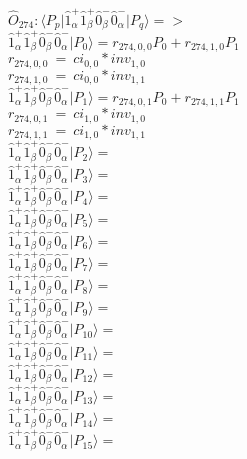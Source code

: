 \documentclass[14pt]{article}
\begin{document}
    $\hat{O}_{274}:  \langle{P_p}\vert \hat{1}_{\alpha}^{+}\hat{1}_{\beta}^{+}\hat{0}_{\beta}^{-}\hat{0}_{\alpha}^{-} \vert{P_q}\rangle => $ \\ 
    $ \hat{1}_{\alpha}^{+}\hat{1}_{\beta}^{+}\hat{0}_{\beta}^{-}\hat{0}_{\alpha}^{-} \vert{P_{0}}\rangle = {r}_{274,0,0}P_{0}+{r}_{274,1,0}P_{1} $ \\ 
    ${r}_{274,0,0}\ =\ {ci}_{0,0}*{inv}_{1,0} $ \\ 
    ${r}_{274,1,0}\ =\ {ci}_{0,0}*{inv}_{1,1} $ \\ 
    $ \hat{1}_{\alpha}^{+}\hat{1}_{\beta}^{+}\hat{0}_{\beta}^{-}\hat{0}_{\alpha}^{-} \vert{P_{1}}\rangle = {r}_{274,0,1}P_{0}+{r}_{274,1,1}P_{1} $ \\ 
    ${r}_{274,0,1}\ =\ {ci}_{1,0}*{inv}_{1,0} $ \\ 
    ${r}_{274,1,1}\ =\ {ci}_{1,0}*{inv}_{1,1} $ \\ 
    $ \hat{1}_{\alpha}^{+}\hat{1}_{\beta}^{+}\hat{0}_{\beta}^{-}\hat{0}_{\alpha}^{-} \vert{P_{2}}\rangle =  $ \\ 
    $ \hat{1}_{\alpha}^{+}\hat{1}_{\beta}^{+}\hat{0}_{\beta}^{-}\hat{0}_{\alpha}^{-} \vert{P_{3}}\rangle =  $ \\ 
    $ \hat{1}_{\alpha}^{+}\hat{1}_{\beta}^{+}\hat{0}_{\beta}^{-}\hat{0}_{\alpha}^{-} \vert{P_{4}}\rangle =  $ \\ 
    $ \hat{1}_{\alpha}^{+}\hat{1}_{\beta}^{+}\hat{0}_{\beta}^{-}\hat{0}_{\alpha}^{-} \vert{P_{5}}\rangle =  $ \\ 
    $ \hat{1}_{\alpha}^{+}\hat{1}_{\beta}^{+}\hat{0}_{\beta}^{-}\hat{0}_{\alpha}^{-} \vert{P_{6}}\rangle =  $ \\ 
    $ \hat{1}_{\alpha}^{+}\hat{1}_{\beta}^{+}\hat{0}_{\beta}^{-}\hat{0}_{\alpha}^{-} \vert{P_{7}}\rangle =  $ \\ 
    $ \hat{1}_{\alpha}^{+}\hat{1}_{\beta}^{+}\hat{0}_{\beta}^{-}\hat{0}_{\alpha}^{-} \vert{P_{8}}\rangle =  $ \\ 
    $ \hat{1}_{\alpha}^{+}\hat{1}_{\beta}^{+}\hat{0}_{\beta}^{-}\hat{0}_{\alpha}^{-} \vert{P_{9}}\rangle =  $ \\ 
    $ \hat{1}_{\alpha}^{+}\hat{1}_{\beta}^{+}\hat{0}_{\beta}^{-}\hat{0}_{\alpha}^{-} \vert{P_{10}}\rangle =  $ \\ 
    $ \hat{1}_{\alpha}^{+}\hat{1}_{\beta}^{+}\hat{0}_{\beta}^{-}\hat{0}_{\alpha}^{-} \vert{P_{11}}\rangle =  $ \\ 
    $ \hat{1}_{\alpha}^{+}\hat{1}_{\beta}^{+}\hat{0}_{\beta}^{-}\hat{0}_{\alpha}^{-} \vert{P_{12}}\rangle =  $ \\ 
    $ \hat{1}_{\alpha}^{+}\hat{1}_{\beta}^{+}\hat{0}_{\beta}^{-}\hat{0}_{\alpha}^{-} \vert{P_{13}}\rangle =  $ \\ 
    $ \hat{1}_{\alpha}^{+}\hat{1}_{\beta}^{+}\hat{0}_{\beta}^{-}\hat{0}_{\alpha}^{-} \vert{P_{14}}\rangle =  $ \\ 
    $ \hat{1}_{\alpha}^{+}\hat{1}_{\beta}^{+}\hat{0}_{\beta}^{-}\hat{0}_{\alpha}^{-} \vert{P_{15}}\rangle =  $ \\ 
    
\end{document}
